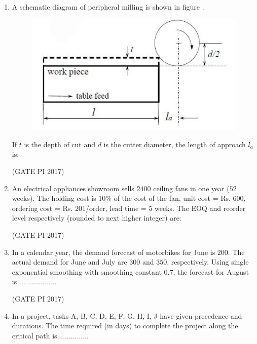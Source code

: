 \documentclass[journal,12pt,onecolumn]{IEEEtran}
\theoremstyle{remark}
\begin{document}
\begin{enumerate}
\item A schematic diagram of peripheral milling is shown in figure .
\newpage
\begin{figure}[h]
    \centering
    \includegraphics[width=0.4\linewidth]{fig6.png}
    \caption{}
    \label{fig:placeholder}
\end{figure}


If $t$ is the depth of cut and $d$ is the cutter diameter, the length of approach $l_a$ is:
\begin{enumerate}
\end{enumerate}
\hfill (GATE PI 2017)

\item An electrical appliances showroom sells $2400$ ceiling fans in one year ($52$ weeks).  
The holding cost is $10\%$ of the cost of the fan, unit cost = Rs. 600, ordering cost = Rs. 201/order, lead time = 5 weeks.  
The EOQ and reorder level respectively (rounded to next higher integer) are:
\begin{enumerate}
\end{enumerate}
\hfill (GATE PI 2017)

\item In a calendar year, the demand forecast of motorbikes for June is $200$.  
The actual demand for June and July are $300$ and $350$, respectively.  
Using single exponential smoothing with smoothing constant $0.7$, the forecast for August is ...................

\hfill (GATE PI 2017)

\item In a project, tasks A, B, C, D, E, F, G, H, I, J have given precedence and durations.  
The time required (in days) to complete the project along the critical path is................ \\


\end{enumerate}
\end{document}
